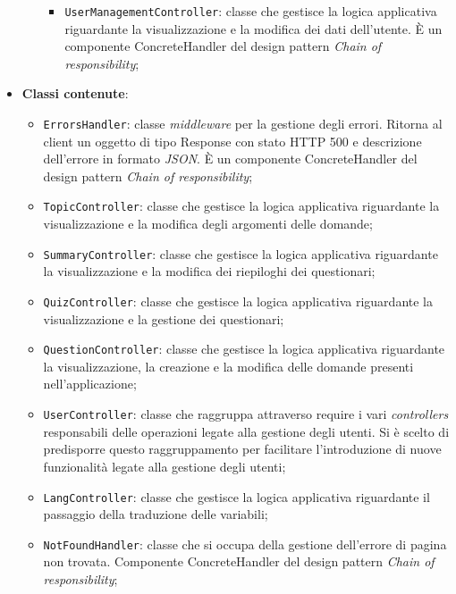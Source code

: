 \begin{itemize}
\begin{itemize}
\begin{itemize}
					\item \texttt{UserManagementController}: classe che gestisce la logica applicativa riguardante la visualizzazione e la modifica dei dati dell'utente.  È un componente ConcreteHandler del design pattern \textit{Chain of responsibility};
				\end{itemize}
			\end{itemize}
		\item \textbf{Classi contenute}:
		\begin{itemize}
			\item \texttt{ErrorsHandler}: classe \textit{middleware} per la gestione degli errori. Ritorna al client un oggetto di tipo Response con stato HTTP 500 e descrizione dell'errore in formato \textit{JSON}. È un componente ConcreteHandler del design pattern \textit{Chain of responsibility};
			\item \texttt{TopicController}: classe che gestisce la logica applicativa riguardante la visualizzazione e la modifica degli argomenti delle domande;
			\item \texttt{SummaryController}: classe che gestisce la logica applicativa riguardante la visualizzazione e la modifica dei riepiloghi dei questionari;
			\item \texttt{QuizController}: classe che gestisce la logica applicativa riguardante la visualizzazione e la gestione dei questionari;
			\item \texttt{QuestionController}: classe che gestisce la logica applicativa riguardante la visualizzazione, la creazione e la modifica delle domande presenti nell'applicazione;
			\item \texttt{UserController}: classe che raggruppa attraverso require i vari \textit{controllers} responsabili delle operazioni legate alla gestione degli utenti. Si è scelto di predisporre questo raggruppamento per facilitare l'introduzione di nuove funzionalità legate alla gestione degli utenti;
			\item \texttt{LangController}: classe che gestisce la logica applicativa riguardante il passaggio della traduzione delle variabili;
			\item \texttt{NotFoundHandler}: classe che si occupa della gestione dell'errore di pagina non trovata.	Componente ConcreteHandler del design pattern \textit{Chain of responsibility};
		\end{itemize}
	\end{itemize}